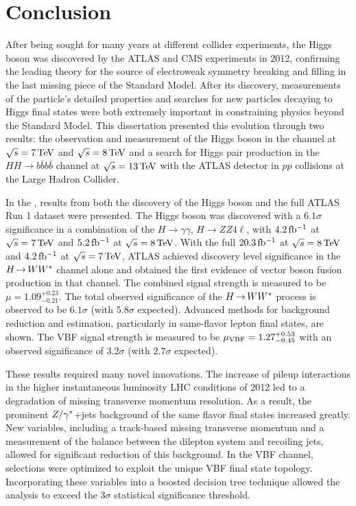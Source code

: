 \chapter{Conclusion}
\label{conclusion}

After being sought for many years at different collider experiments, the Higgs boson was discovered by the ATLAS and CMS experiments in 2012, confirming the leading theory for the source of electroweak symmetry breaking and filling in the last missing piece of the Standard Model. After its discovery, measurements of the particle's detailed properties and searches for new particles decaying to Higgs final states were both extremely important in constraining physics beyond the Standard Model. This dissertation presented this evolution through two results: the observation and measurement of the Higgs boson in the \HWWfull channel at $\sqrt{s} = 7 \TeV$ and $\sqrt{s} = 8 \TeV$ and a search for Higgs pair production in the $HH\to b\bar{b}b\bar{b}$ channel at $\sqrt{s} = 13 \TeV$ with the ATLAS detector in $pp$ collisions at the Large Hadron Collider.

In the \HWWfull, results from both the discovery of the Higgs boson and the full ATLAS Run 1 dataset were presented. The Higgs boson was discovered with a $6.1\sigma$ significance in a combination of the $H\to\gamma\gamma$, $H\to ZZ 4\ell$, \HWWfull with $4.2\mbox{\,fb$^{-1}$}$ at $\sqrt{s} = 7 \TeV$ and $5.2\mbox{\,fb$^{-1}$}$ at $\sqrt{s} = 8 \TeV$. With the full $20.3\mbox{\,fb$^{-1}$}$ at $\sqrt{s} =  8 \TeV$ and $4.2\mbox{\,fb$^{-1}$}$ at $\sqrt{s} = 7 \TeV$, ATLAS achieved discovery level significance in the $H{\,{\rightarrow}\,}WW^\ast$ channel alone and obtained the first evidence of vector boson fusion production in that channel. The combined signal strength is measured to be $\mu = 1.09^{+0.23}_{-0.21}$. The total observed significance of the $H{\,{\rightarrow}\,}WW^\ast$ process is observed to be $6.1\sigma$ (with $5.8 \sigma$ expected). Advanced methods for background reduction and estimation, particularly in same-flavor lepton final states, are shown. The VBF signal strength is measured to be $\mu_{\rm VBF} = 1.27^{+0.53}_{-0.45}$ with an observed significance of $3.2\sigma$ (with $2.7 \sigma$ expected). 

These results required many novel innovations. The increase of pileup interactions in the higher instantaneous luminosity LHC conditions of 2012 led to a degradation of missing transverse momentum resolution. As a result, the prominent $Z/\gamma^{\ast}$+jets background of the same flavor \HWWfull final states increased greatly. New variables, including a track-based missing transverse momentum and a measurement of the balance between the dilepton system and recoiling jets, allowed for significant reduction of this background. In the VBF channel, selections were optimized to exploit the unique VBF final state topology. Incorporating these variables into a boosted decision tree technique allowed the analysis to exceed the $3\sigma$ statistical significance threshold.

